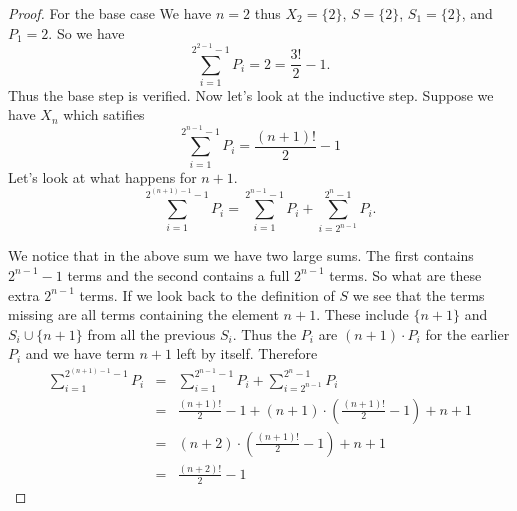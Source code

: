 \documentclass[10 pt]{amsart}
\theoremstyle{definition}
\theoremstyle{remark}
\numberwithin{equation}{subsection}
\begin{document}
\begin{proof}
For the base case We have $n=2$ thus $X_2=\{2\}$, $S=\{2\}$, $S_1 = \{2\}$, and $P_1=2$. So we have 
\[
\sum_{i=1}^{2^{2-1}-1}P_i = 2 = \frac{3!}{2}-1.
\]
Thus the base step is verified.  Now let's look at the inductive step.  Suppose we have $X_n$ which satifies
\[
\sum_{i=1}^{2^{n-1}-1} P_i = \frac{(n+1)!}{2} -1
\]
Let's look at what happens for $n+1$.
\[
\sum_{i=1}^{2^{(n+1)-1}-1} P_i = \sum_{i=1}^{2^{n-1}-1} P_i + \sum_{i=2^{n-1}}^{2^{n}-1} P_i.
\]

We notice that in the above sum we have two large sums.  The first contains $2^{n-1}-1$ terms and the second contains a full $2^{n-1}$ terms.  So what are these extra $2^{n-1}$ terms.  If we look back to the definition of $S$ we see that the terms missing are all terms containing the element $n+1$.  These include $\{n+1\}$ and $S_i \cup \{n+1\}$ from all the previous $S_i$.  Thus the $P_i$ are $(n+1)\cdot P_i$ for the earlier $P_i$ and we have term $n+1$ left by itself.  Therefore
\begin{eqnarray*}
\sum_{i=1}^{2^{(n+1)-1}-1} P_i &=& \sum_{i=1}^{2^{n-1}-1} P_i + \sum_{i=2^{n-1}}^{2^{n}-1} P_i\\
&=& \frac{(n+1)!}{2}-1 + (n+1)\cdot\left(\frac{(n+1)!}{2}-1\right) + n+1 \\
&=& (n+2)\cdot\left(\frac{(n+1)!}{2}-1\right) + n+1\\
&=& \frac{(n+2)!}{2} -1
\end{eqnarray*}

\end{proof}
\end{document}
